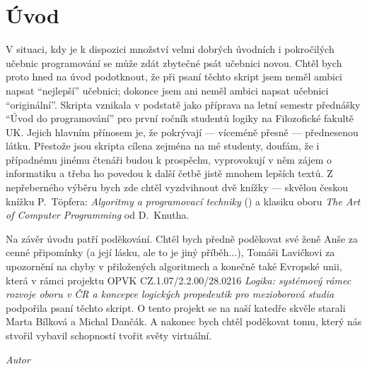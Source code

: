 \chapter*{Úvod}
V situaci, kdy je k dispozici množství velmi dobrých úvodních i pokročilých
učebnic programování se může zdát zbytečné psát učebnici novou. Chtěl bych
proto hned na úvod podotknout, že při psaní těchto skript jsem neměl ambici
napsat ``nejlepší'' učebnici; dokonce jsem ani neměl ambici napsat učebnici
``originální''. Skripta vznikala v podstatě jako příprava na letní semestr
přednášky ``Úvod do programování'' pro první ročník studentů logiky na 
Filozofické fakultě UK. Jejich hlavním přínosem je, že pokrývají --- víceméně 
přesně --- přednesenou látku. Přestože jsou skripta cílena zejména na 
mé studenty, doufám, že i případnému jinému čtenáři budou k prospěchu,
vyprovokují v něm zájem o informatiku a třeba ho povedou k další četbě jistě
mnohem lepších textů. Z nepřeberného výběru bych zde chtěl vyzdvihnout dvě
knížky --- skvělou českou knížku P.~T\"opfera: \emph{Algoritmy a programovací techniky}
(\cite{Topfer:1995}) a klasiku oboru \emph{The Art of Computer Programming} od
D.~Knutha.

Na závěr úvodu patří poděkování. Chtěl bych předně poděkovat své ženě Anše
za cenné připomínky (a její lásku, ale to je jiný příběh$\ldots$), Tomáši
Lavičkovi za upozornění na chyby v přiložených algoritmech a konečně také
Evropské unii, která v rámci projektu OPVK CZ.1.07/2.2.00/28.0216 
\emph{Logika: systémový rámec rozvoje oboru v ČR a koncepce logických 
propedeutik pro mezioborová studia} podpořila psaní těchto skript. O tento
projekt se na naší katedře skvěle starali Marta Bílková a Michal Dančák. 
A nakonec bych chtěl poděkovat tomu, který nás stvořil vybavil schopností 
tvořit světy virtuální.

\hfill \emph{Autor}



\ifx\ucebnice\undefined

\fi